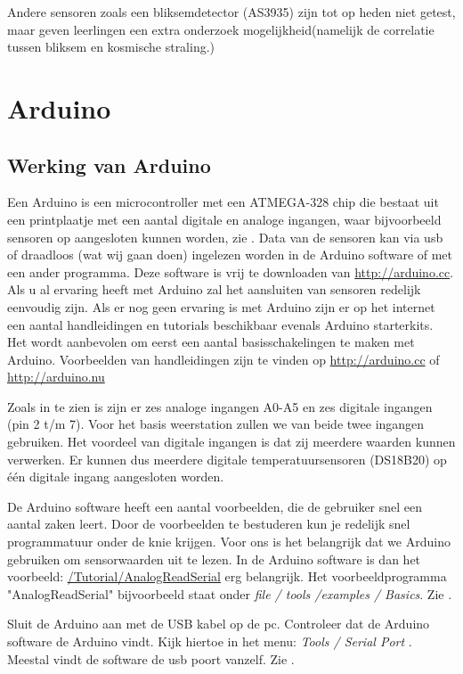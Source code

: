 Andere sensoren zoals een bliksemdetector (AS3935) zijn tot op heden
niet getest, maar geven leerlingen een extra onderzoek
mogelijkheid(namelijk de correlatie tussen bliksem en kosmische
straling.)

\section{Arduino}

\subsection{Werking van Arduino}

Een Arduino is een microcontroller met een ATMEGA-328 chip die bestaat
uit een printplaatje met een aantal digitale en analoge ingangen, waar
bijvoorbeeld sensoren op aangesloten kunnen worden, zie
. Data van de sensoren kan via usb of draadloos (wat
wij gaan doen) ingelezen worden in de Arduino software of met een ander
programma. Deze software is vrij te downloaden van
\url{http://arduino.cc}. Als u al ervaring heeft met Arduino zal het
aansluiten van sensoren redelijk eenvoudig zijn. Als er nog geen
ervaring is met Arduino zijn er op het internet een aantal handleidingen
en tutorials beschikbaar evenals Arduino starterkits. Het wordt
aanbevolen om eerst een aantal basisschakelingen te maken met Arduino.
Voorbeelden van handleidingen zijn te vinden  op \url{http://arduino.cc}
of \url{http://arduino.nu}

Zoals in  te zien is zijn er zes analoge ingangen
A0-A5 en zes digitale ingangen (pin 2 t/m 7). Voor het basis weerstation
zullen we van beide twee ingangen gebruiken. Het voordeel van digitale
ingangen is dat zij meerdere waarden kunnen verwerken. Er kunnen dus
meerdere digitale temperatuursensoren (DS18B20) op één digitale ingang
aangesloten worden.

De Arduino software heeft een aantal voorbeelden, die de gebruiker snel
een aantal zaken leert. Door de voorbeelden te bestuderen kun je
redelijk snel programmatuur onder de knie krijgen. Voor ons is het
belangrijk dat we Arduino gebruiken om sensorwaarden uit te lezen. In
de Arduino software is dan het voorbeeld:
\url{/Tutorial/AnalogReadSerial} erg belangrijk. Het voorbeeldprogramma
"AnalogReadSerial" bijvoorbeeld staat onder \emph{file / tools /examples /
Basics}. Zie .  

Sluit de Arduino aan met de USB kabel op de pc. Controleer dat de
Arduino software de Arduino vindt. Kijk hiertoe in het menu: \emph{
Tools / Serial Port }. Meestal vindt de software de usb poort vanzelf.
Zie .

